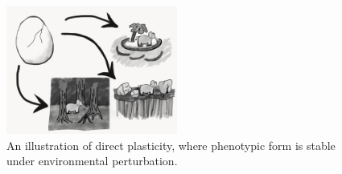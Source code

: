 \begin{figure} 
  \includegraphics[width=0.5\textwidth]{img/elephant_developmental_perturbation.jpg}

  \caption{An illustration of direct plasticity, where phenotypic form is stable under environmental perturbation.}
  \label{fig:elephant_developmental_perturbation}
\end{figure}